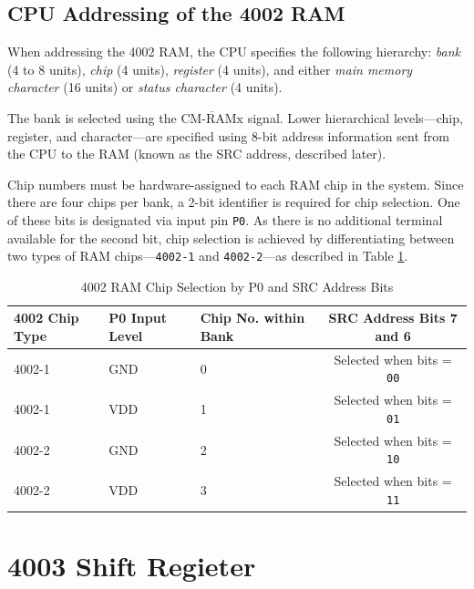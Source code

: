 \subsection{CPU Addressing of the 4002 RAM}

When addressing the 4002 RAM, the CPU specifies the following hierarchy: \textit{bank} (4 to 8 units), \textit{chip} (4 units), \textit{register} (4 units), and either \textit{main memory character} (16 units) or \textit{status character} (4 units).

The bank is selected using the $\overline{\text{CM-RAMx}}$ signal. Lower hierarchical levels—chip, register, and character—are specified using 8-bit address information sent from the CPU to the RAM (known as the SRC address, described later).

Chip numbers must be hardware-assigned to each RAM chip in the system. Since there are four chips per bank, a 2-bit identifier is required for chip selection. One of these bits is designated via input pin \texttt{P0}. As there is no additional terminal available for the second bit, chip selection is achieved by differentiating between two types of RAM chips—\texttt{4002-1} and \texttt{4002-2}—as described in Table \ref{tb:RAMCHIPSELECTION}.

\begin{table}[h]
\centering
\begin{tabular}{|p{2cm}|p{2cm}|p{2cm}|c|}
\hline
\rowcolor{LightPurple}
\textbf{4002 Chip Type} & \textbf{P0 Input Level} & \textbf{Chip No. within Bank} & \textbf{SRC Address Bits 7 and 6} \\
\hline
4002-1 & GND & 0 & Selected when bits = \texttt{00} \\
4002-1 & VDD & 1 & Selected when bits = \texttt{01} \\
4002-2 & GND & 2 & Selected when bits = \texttt{10} \\
4002-2 & VDD & 3 & Selected when bits = \texttt{11} \\
\hline
\end{tabular}
\caption{4002 RAM Chip Selection by P0 and SRC Address Bits}
\label{tb:RAMCHIPSELECTION}
\end{table}

\section{4003 Shift Regieter}
